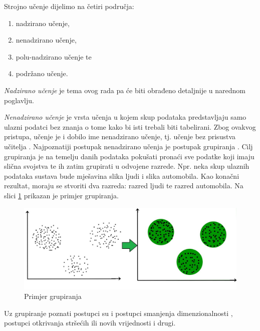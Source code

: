 \documentclass[times, utf8, zavrsni]{fer}
\begin{document}
Strojno učenje dijelimo na četiri područja:
\begin{center}
    \begin{enumerate}
        \item nadzirano učenje,
        \item nenadzirano učenje,
        \item polu-nadzirano učenje te
        \item podržano učenje.
    \end{enumerate}
\end{center}

\textit{Nadzirano učenje} je tema ovog rada pa će biti obrađeno detaljnije u narednom poglavlju.

\bigskip

\textit{Nenadzirano učenje}  je vrsta učenja u kojem skup podataka predstavljaju samo ulazni podatci bez znanja o tome kako bi isti trebali biti tabelirani. Zbog ovakvog pristupa, učenje je i dobilo ime nenadzirano učenje, tj. učenje bez prisustva učitelja . Najpoznatiji postupak nenadzirano učenja je postupak grupiranja . Cilj grupiranja je na temelju danih podataka pokušati pronaći sve podatke koji imaju slična svojstva te ih zatim grupirati u odvojene razrede. Npr. neka skup ulaznih podataka sustava bude mješavina slika ljudi i slika automobila. Kao konačni rezultat, moraju se stvoriti dva razreda: razred ljudi te razred automobila. Na slici \ref{fig:clustering} prikazan je primjer grupiranja.

\begin{figure}[H]
    \centering
    \includegraphics[scale=0.75]{img/clustering.jpg}
    \caption[Caption for LOF]{Primjer grupiranja\footnotemark}
    \label{fig:clustering}
\end{figure}

Uz grupiranje poznati postupci su i postupci smanjenja dimenzionalnosti , postupci otkrivanja stršećih ili novih vrijednosti  i drugi.
\end{document}
